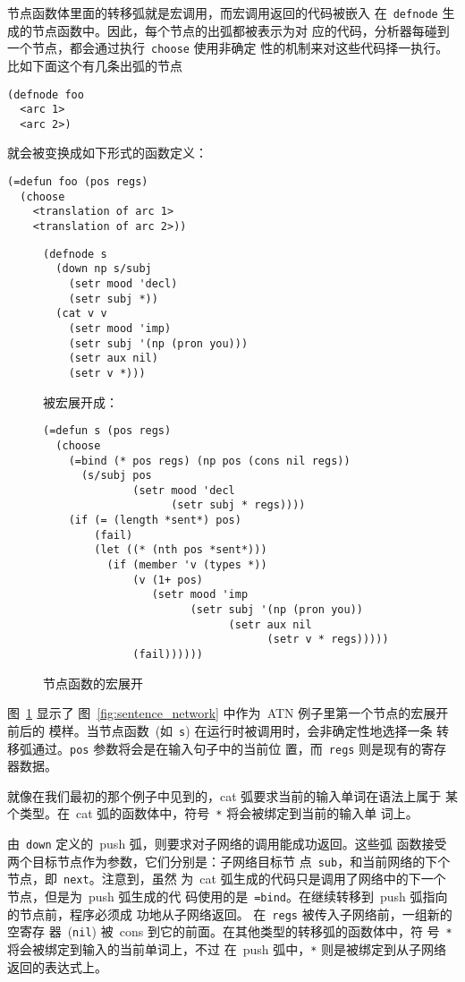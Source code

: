 节点函数体里面的转移弧就是宏调用，而宏调用返回的代码被嵌入
在~\texttt{defnode} 生成的节点函数中。因此，每个节点的出弧都被表示为对
应的代码，分析器每碰到一个节点，都会通过执行~\texttt{choose} 使用非确定
性的机制来对这些代码择一执行。比如下面这个有几条出弧的节点
\begin{lstlisting}
(defnode foo
  <arc 1>
  <arc 2>)
\end{lstlisting}
就会被变换成如下形式的函数定义：
\begin{lstlisting}
(=defun foo (pos regs)
  (choose
    <translation of arc 1>
    <translation of arc 2>))
\end{lstlisting}

\begin{figure}
\begin{lstlisting}
(defnode s
  (down np s/subj
    (setr mood 'decl)
    (setr subj *))
  (cat v v
    (setr mood 'imp)
    (setr subj '(np (pron you)))
    (setr aux nil)
    (setr v *)))
\end{lstlisting}
被宏展开成：
\begin{lstlisting}
(=defun s (pos regs)
  (choose
    (=bind (* pos regs) (np pos (cons nil regs))
      (s/subj pos
              (setr mood 'decl
                    (setr subj * regs))))
    (if (= (length *sent*) pos)
        (fail)
        (let ((* (nth pos *sent*)))
          (if (member 'v (types *))
              (v (1+ pos)
                 (setr mood 'imp
                       (setr subj '(np (pron you))
                             (setr aux nil
                                   (setr v * regs)))))
              (fail))))))
\end{lstlisting}
  \caption{节点函数的宏展开}
  \label{fig:macroexpansion_of_a_node_function}
\end{figure}

图~\ref{fig:macroexpansion_of_a_node_function} 显示了
图~\ref{fig:sentence_network} 中作为~\textsc{ATN} 例子里第一个节点的宏展开前后的
模样。当节点函数~(如~\texttt{s}) 在运行时被调用时，会非确定性地选择一条
转移弧通过。\texttt{pos} 参数将会是在输入句子中的当前位
置，而~\texttt{regs} 则是现有的寄存器数据。

就像在我们最初的那个例子中见到的，cat 弧要求当前的输入单词在语法上属于
某个类型。在~cat 弧的函数体中，符号~\texttt{*} 将会被绑定到当前的输入单
词上。

由~\texttt{down} 定义的~push 弧，则要求对子网络的调用能成功返回。这些弧
函数接受两个目标节点作为参数，它们分别是：子网络目标节
点~\texttt{sub}，和当前网络的下个节点，即~\texttt{next}。注意到，虽然
为~cat 弧生成的代码只是调用了网络中的下一个节点，但是为~push 弧生成的代
码使用的是~\texttt{=bind}。在继续转移到~push 弧指向的节点前，程序必须成
功地从子网络返回。 在~\texttt{regs} 被传入子网络前，一组新的空寄存
器~(\texttt{nil}) 被~cons 到它的前面。在其他类型的转移弧的函数体中，符
号~\texttt{*} 将会被绑定到输入的当前单词上，不过
在~push 弧中，\texttt{*} 则是被绑定到从子网络返回的表达式上。


